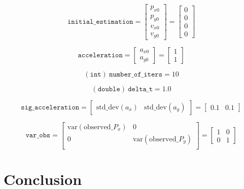 \documentclass[12pt]{article}
\begin{document}
	\begin{equation}
		\mathtt{initial\_estimation}=
		\begin{bmatrix}
			p_{x0} \\ p_{y0} \\ v_{x0} \\ v_{y0}
		\end{bmatrix}=
		\begin{bmatrix}
			0 \\ 0 \\ 0 \\ 0
		\end{bmatrix}
	\end{equation}

	\begin{equation}
			\mathtt{acceleration}=
			\begin{bmatrix}
				a_{x0} \\ a_{y0}
			\end{bmatrix}=
			\begin{bmatrix}
				1 \\ 1
			\end{bmatrix}
	\end{equation}

	\begin{equation}
			(\mathtt{int})\ \mathtt{number\_of\_iters}=10
	\end{equation}

	\begin{equation}
			(\mathtt{double})\ \mathtt{delta\_t}=1.0
	\end{equation}

	\begin{equation}
			\mathtt{sig\_acceleration}=
			\begin{bmatrix}
				\mathrm{std\_dev}(a_x) & \mathrm{std\_dev}(a_y)
			\end{bmatrix}=
			\begin{bmatrix}
				0.1 & 0.1
			\end{bmatrix}
	\end{equation}

	\begin{equation}
			\mathtt{var\_obs}=
			\begin{bmatrix}
				\mathrm{var}(\mathrm{observed}\_P_x) & 0 \\
				0 & \mathrm{var}(\mathrm{observed}\_P_y) \\
			\end{bmatrix}=
			\begin{bmatrix}
				1 & 0 \\
				0 & 1
			\end{bmatrix}
	\end{equation}
	\section{Conclusion}
\end{document}
